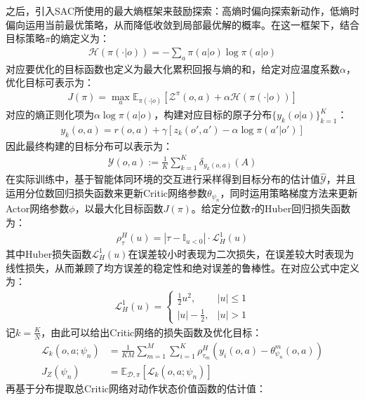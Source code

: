 之后，引入SAC\cite{haarnoja2018soft}所使用的最大熵框架来鼓励探索：高熵时偏向探索新动作，低熵时偏向运用当前最优策略，从而降低收敛到局部最优解的概率。在这一框架下，结合目标策略$\pi$的熵定义为：
\begin{align}
    \mathcal{H}(\pi(\cdot|o)) = -\sum_{a} \pi(a|o) \log \pi(a|o)
\end{align}
对应要优化的目标函数也定义为最大化累积回报与熵的和，给定对应温度系数$\alpha$，优化目标可表示为：
\begin{align}
    J(\pi) = \max_a \mathbb{E}_{\pi(\cdot|o)}\left[ \mathcal{Z}^\pi(o,a) + \alpha \mathcal{H}(\pi(\cdot|o)) \right]
\end{align}
对应的熵正则化项为$\alpha \log \pi(a|o)$，构建对应目标的原子分布$\{y_k(o|a)\}_{k=1}^K$：
\begin{align}
    y_k(o, a) = r(o, a) + \gamma \left[ z_{k}(o', a') - \alpha \log \pi(a'|o') \right]
\end{align}
因此最终构建的目标分布可以表示为：
\begin{align}
    \mathcal{Y}(o, a) := \frac{1}{K} \sum_{k=1}^K \delta_{y_k(o,a)}(A)
\end{align}
在实际训练中，基于智能体同环境的交互进行采样得到目标分布的估计值$\hat{\mathcal{Y}}$，并且运用分位数回归损失函数来更新Critic网络参数$\theta_{\psi_n}$，同时运用策略梯度方法来更新Actor网络参数$\phi$，以最大化目标函数$J(\pi)$。给定分位数$\tau$的Huber回归损失函数为：
\begin{align}
\rho_\tau^H(u) = |\tau - \mathbb{I}_{{u < 0}}| \cdot \mathcal{L}_H^1(u)
\end{align}
其中Huber损失函数$\mathcal{L}_H^1(u)$在误差较小时表现为二次损失，在误差较大时表现为线性损失，从而兼顾了均方误差的稳定性和绝对误差的鲁棒性。在对应公式中定义为：
\begin{align}
    \mathcal{L}_H^1(u) = \left\{\begin{matrix}
        \frac{1}{2}u^2, & |u| \leq 1\\
        |u| - \frac{1}{2}, & |u| > 1
        \end{matrix}\right.
\end{align}
记$k=\frac{K}{N}$，由此可以给出Critic网络的损失函数及优化目标：
\begin{align}
    \mathcal{L}_k(o,a;\psi_n) &= \frac{1}{KM} \sum_{m=1}^M \sum_{i=1}^K \rho_{\tau_m}^H(y_i(o,a) - \theta_{\psi_n}^{m}(o,a)) \\ 
    J_Z(\psi_n)&=\mathbb{E}_{\mathcal{D},\pi}[\mathcal{L}_k(o,a;\psi_n)]\label{eq:critic_loss}
\end{align}
再基于分布提取总Critic网络对动作状态价值函数的估计值：
